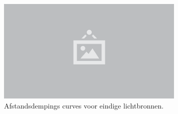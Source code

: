\begin{figure}
  \centering
  \includegraphics[width=0.8\textwidth]{./img/raw/placeholder.png}
  \caption{Afstandsdempings curves voor eindige lichtbronnen.}
  \label{fig:pl-distance-attenuation-rt}
\end{figure}
